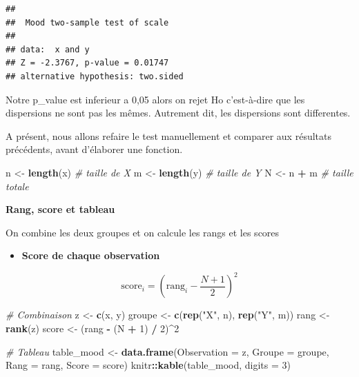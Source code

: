 \documentclass[
  12pt,
]{article}
\newenvironment{Shaded}{\begin{snugshade}}{\end{snugshade}}
\newcommand{\AttributeTok}[1]{\textcolor[rgb]{0.13,0.29,0.53}{#1}}
\newcommand{\CommentTok}[1]{\textcolor[rgb]{0.56,0.35,0.01}{\textit{#1}}}
\newcommand{\DecValTok}[1]{\textcolor[rgb]{0.00,0.00,0.81}{#1}}
\newcommand{\FunctionTok}[1]{\textcolor[rgb]{0.13,0.29,0.53}{\textbf{#1}}}
\newcommand{\NormalTok}[1]{#1}
\newcommand{\OtherTok}[1]{\textcolor[rgb]{0.56,0.35,0.01}{#1}}
\newcommand{\SpecialCharTok}[1]{\textcolor[rgb]{0.81,0.36,0.00}{\textbf{#1}}}
\newcommand{\StringTok}[1]{\textcolor[rgb]{0.31,0.60,0.02}{#1}}
\providecommand{\tightlist}{%
  \setlength{\itemsep}{0pt}\setlength{\parskip}{0pt}}
\begin{document}
\begin{verbatim}
## 
##  Mood two-sample test of scale
## 
## data:  x and y
## Z = -2.3767, p-value = 0.01747
## alternative hypothesis: two.sided
\end{verbatim}

Notre p\_value est inferieur a 0,05 alors on rejet Ho c'est-à-dire que
les dispersions ne sont pas les mêmes. Autrement dit, les dispersions
sont differentes.

A présent, nous allons refaire le test manuellement et comparer aux
résultats précédents, avant d'élaborer une fonction.

\begin{Shaded}
\begin{Highlighting}[]
\NormalTok{n }\OtherTok{\textless{}{-}} \FunctionTok{length}\NormalTok{(x) }\CommentTok{\# taille de X}
\NormalTok{m }\OtherTok{\textless{}{-}} \FunctionTok{length}\NormalTok{(y) }\CommentTok{\# taille de Y}
\NormalTok{N }\OtherTok{\textless{}{-}}\NormalTok{ n }\SpecialCharTok{+}\NormalTok{ m     }\CommentTok{\# taille totale}
\end{Highlighting}
\end{Shaded}

\textbf{Rang, score et tableau}

On combine les deux groupes et on calcule les rangs et les scores

\begin{itemize}
\tightlist
\item
  \textbf{Score de chaque observation}
\end{itemize}

\[
\text{score}_i = \left( \text{rang}_i - \frac{N + 1}{2} \right)^2
\]

\begin{Shaded}
\begin{Highlighting}[]
\CommentTok{\# Combinaison}
\NormalTok{z }\OtherTok{\textless{}{-}} \FunctionTok{c}\NormalTok{(x, y)}
\NormalTok{groupe }\OtherTok{\textless{}{-}} \FunctionTok{c}\NormalTok{(}\FunctionTok{rep}\NormalTok{(}\StringTok{"X"}\NormalTok{, n), }\FunctionTok{rep}\NormalTok{(}\StringTok{"Y"}\NormalTok{, m))}
\NormalTok{rang }\OtherTok{\textless{}{-}} \FunctionTok{rank}\NormalTok{(z)}
\NormalTok{score }\OtherTok{\textless{}{-}}\NormalTok{ (rang }\SpecialCharTok{{-}}\NormalTok{ (N }\SpecialCharTok{+} \DecValTok{1}\NormalTok{) }\SpecialCharTok{/} \DecValTok{2}\NormalTok{)}\SpecialCharTok{\^{}}\DecValTok{2}

\CommentTok{\# Tableau}
\NormalTok{table\_mood }\OtherTok{\textless{}{-}} \FunctionTok{data.frame}\NormalTok{(}\AttributeTok{Observation =}\NormalTok{ z, }\AttributeTok{Groupe =}\NormalTok{ groupe, }\AttributeTok{Rang =}\NormalTok{ rang, }\AttributeTok{Score =}\NormalTok{ score)}
\NormalTok{knitr}\SpecialCharTok{::}\FunctionTok{kable}\NormalTok{(table\_mood, }\AttributeTok{digits =} \DecValTok{3}\NormalTok{)}
\end{Highlighting}
\end{Shaded}
\end{document}
